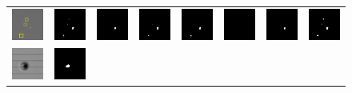 \documentclass[sn-mathphys]{sn-jnl}%
\theoremstyle{thmstyleone}%
\theoremstyle{thmstyletwo}%
\theoremstyle{thmstylethree}%
\begin{document}
\begin{figure}
{\begin{tabular}{p{1.3cm}p{1.3cm}p{1.3cm}p{1.3cm}p{1.3cm}p{1.3cm}p{1.3cm}p{1.3cm}}
    \includegraphics[width=0.65in]{fig13-bodao55inputs.png}&
    \includegraphics[width=0.65in]{fig13-bodao55y.png}&
    \includegraphics[width=0.65in]{fig13-bodao55baseline.png}&
    \includegraphics[width=0.65in]{fig13-bodao55cutout.png}&
    \includegraphics[width=0.65in]{fig13-bodao55has.png}&
    \includegraphics[width=0.65in]{fig13-bodao55gridmask.png}&
    \includegraphics[width=0.65in]{fig13-bodao55cutmix.png}&
    \includegraphics[width=0.65in]{fig13-bodao55ours.png}\\
    \includegraphics[width=0.65in]{fig13-qipao44inputs.png}&
    \includegraphics[width=0.65in]{fig13-qipao44y.png}&

\end{tabular}}
\end{figure}
\end{document}
